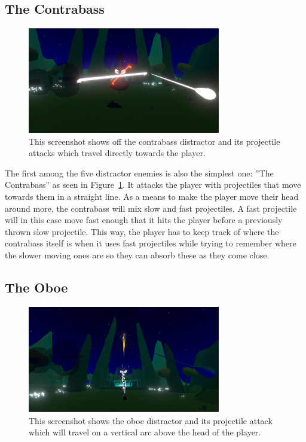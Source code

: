 \subsection{The Contrabass}
\begin{figure}[tbph]
    \centering
    \includegraphics[width=0.75\textwidth]{figures/screenshots/contrabass.png}
    \caption[The Contrabass Distractor]{This screenshot shows off the contrabass distractor and its projectile attacks which travel directly towards the player.}
    \label{fig:contrabassDistractor}
\end{figure}
The first among the five distractor enemies is also the simplest one: ''The Contrabass'' as seen in Figure~\ref{fig:contrabassDistractor}. It attacks the player with projectiles that move towards them in a straight line. As a means to make the player move their head around more, the contrabass will mix slow and fast projectiles. A fast projectile will in this case move fast enough that it hits the player before a previously thrown slow projectile. This way, the player has to keep track of where the contrabass itself is when it uses fast projectiles while trying to remember where the slower moving ones are so they can absorb these as they come close. 
 
\subsection{The Oboe}
\begin{figure}[tbph]
    \centering
    \includegraphics[width=0.75\textwidth]{figures/screenshots/oboe.png}
    \caption[The Oboe Distractor]{This screenshot shows the oboe distractor and its projectile attack which will travel on a vertical arc above the head of the player.}
    \label{fig:oboeDistractor}
\end{figure}

